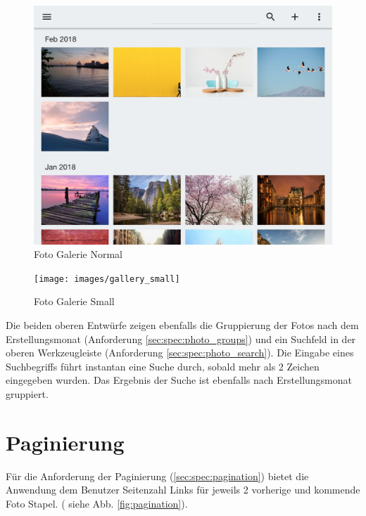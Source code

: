 \begin{figure}[htp]     %
\centering
\includegraphics[width=1.0\textwidth]{images/gallery_normal} 
\caption{Foto Galerie Normal}\label{fig:gallery_normal}
\end{figure}

\begin{figure}[htp]     %
\centering
\texttt{[image: images/gallery\_small]} 
\caption{Foto Galerie Small}\label{fig:gallery_small}
\end{figure}

Die beiden oberen Entwürfe zeigen ebenfalls die Gruppierung der Fotos nach dem Erstellungsmonat (Anforderung \ref{sec:spec:photo_groups}) und ein Suchfeld in der oberen Werkzeugleiste (Anforderung \ref{sec:spec:photo_search}). Die Eingabe eines Suchbegriffs führt instantan eine Suche durch, sobald mehr als 2 Zeichen eingegeben wurden. Das Ergebnis der Suche ist ebenfalls nach Erstellungsmonat gruppiert.

\section{Paginierung}

Für die Anforderung der Paginierung (\ref{sec:spec:pagination}) bietet die Anwendung dem Benutzer Seitenzahl Links für jeweils 2 vorherige und kommende Foto Stapel.
( siehe Abb. \ref{fig:pagination}).

